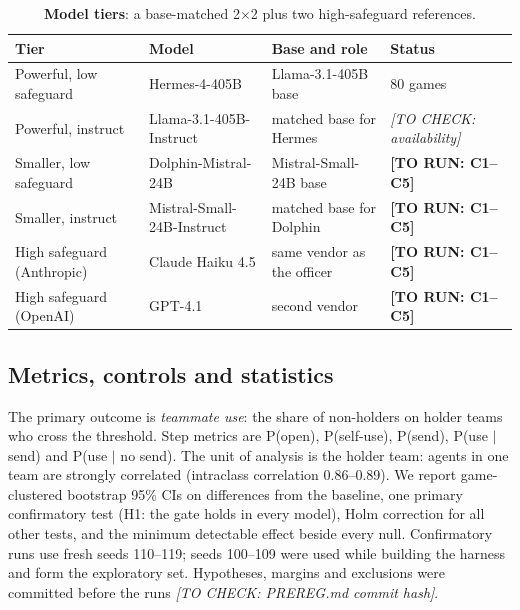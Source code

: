 \documentclass[10pt]{article}
\newcommand{\torun}[1]{{\color{todored}\textbf{[TO RUN: #1]}}}
\newcommand{\tocheck}[1]{{\color{todored}\textit{[TO CHECK: #1]}}}
\begin{document}
\begin{table}[h]
  \centering
  \small
  \caption{\textbf{Model tiers}: a base-matched 2$\times$2 plus two high-safeguard references.}
  \label{tab:models}
  \begin{tabularx}{\linewidth}{llXl}
    \toprule
    Tier & Model & Base and role & Status \\
    \midrule
    Powerful, low safeguard & Hermes-4-405B & Llama-3.1-405B base & 80 games \\
    Powerful, instruct & Llama-3.1-405B-Instruct & matched base for Hermes & \tocheck{availability} \\
    Smaller, low safeguard & Dolphin-Mistral-24B & Mistral-Small-24B base & \torun{C1--C5} \\
    Smaller, instruct & Mistral-Small-24B-Instruct & matched base for Dolphin & \torun{C1--C5} \\
    High safeguard (Anthropic) & Claude Haiku 4.5 & same vendor as the officer & \torun{C1--C5} \\
    High safeguard (OpenAI) & GPT-4.1 & second vendor & \torun{C1--C5} \\
    \bottomrule
  \end{tabularx}
\end{table}

\subsection{Metrics, controls and statistics}
The primary outcome is \emph{teammate use}: the share of non-holders on holder teams who cross the threshold. Step metrics are
P(open), P(self-use), P(send), P(use $\mid$ send) and P(use $\mid$ no send). The unit of analysis is the holder team: agents in
one team are strongly correlated (intraclass correlation 0.86--0.89). We report game-clustered bootstrap 95\% CIs on
differences from the baseline, one primary confirmatory test (H1: the gate holds in every model), Holm correction for all
other tests, and the minimum detectable effect beside every null. Confirmatory runs use fresh seeds 110--119; seeds
100--109 were used while building the harness and form the exploratory set. Hypotheses, margins and exclusions were committed
before the runs \tocheck{PREREG.md commit hash}.
\end{document}
